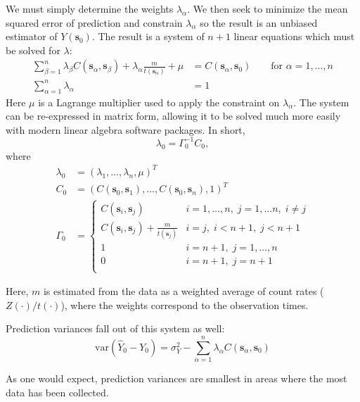We must simply determine the weights \(\lambda_\alpha\). We then seek to
minimize the mean squared error of prediction and constrain \(\lambda_\alpha\)
so the result is an unbiased estimator of \(Y(\mathbf{s}_0)\). The result is a
system of \(n+1\) linear equations which must be solved for \(\lambda\):
\begin{align}
  \sum_{\beta=1}^n \lambda_\beta C(\mathbf{s}_\alpha, \mathbf{s}_\beta) +
  \lambda_\alpha \frac{m}{t(\mathbf{s}_\alpha)} + \mu &= C(\mathbf{s}_\alpha,
  \mathbf{s}_0)\qquad \text{for } \alpha = 1, \ldots, n\\
  \sum_{\alpha=1}^n \lambda_\alpha &= 1
\end{align}
Here \(\mu\) is a Lagrange multiplier used to apply the constraint on
\(\lambda_\alpha\). The system can be re-expressed in matrix form, allowing it
to be solved much more easily with modern linear algebra software packages. In
short,
\begin{equation}\label{krige-system}
  \lambda_0 = \Gamma_0^{-1} C_0,
\end{equation}
where
\begin{align}
  \lambda_0 &= (\lambda_1, \ldots, \lambda_n, \mu)^T\\
  C_0 &= (C(\mathbf{s}_0, \mathbf{s}_1),\ldots, C(\mathbf{s}_0, \mathbf{s}_n),
  1)^T\\
  \Gamma_0 &= \begin{cases}
C(\mathbf{s}_i, \mathbf{s}_j) & i=1,\ldots,n,\; j=1,\ldots n, \; i\neq j\\
C(\mathbf{s}_i, \mathbf{s}_j) + \frac{m}{t(\mathbf{s}_j)} & i=j, \; i<n+1,\; j<n+1\\
1 & i = n+1,\; j=1,\ldots,n\\
0 & i=n+1, \; j=n+1\\
\end{cases}
\end{align}

Here, \(m\) is estimated from the data as a weighted average of count rates
(\(Z(\cdot)/t(\cdot)\)), where the weights correspond to the observation
times. %

Prediction variances fall out of this system as well:
\begin{equation}\label{prediction-variance}
\text{var}(\hat Y_0 - Y_0) = \sigma_Y^2 - \sum_{\alpha = 1}^n \lambda_\alpha
C(\mathbf{s}_\alpha, \mathbf{s}_0)
\end{equation}

As one would expect, prediction variances are smallest in areas where the most
data has been collected.

